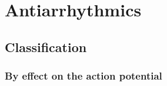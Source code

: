 \documentclass[
  12pt,
]{memoir}
\begin{document}
\hypertarget{antiarrhythmics-1}{%
\section{Antiarrhythmics}\label{antiarrhythmics-1}}

\label{sec:antiarr}

\hypertarget{classification}{%
\subsection{Classification}\label{classification}}

\hypertarget{by-effect-on-the-action-potential}{%
\subsubsection{By effect on the action
potential}\label{by-effect-on-the-action-potential}}
\end{document}
